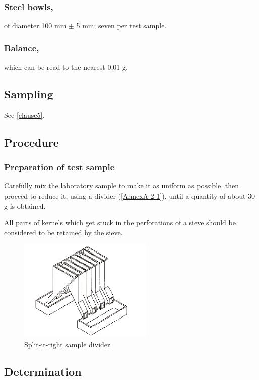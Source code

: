 \label{AnnexA-2-6}
\subsubsection{Steel bowls,}

of diameter 100 mm $\pm$ 5 mm; seven per test sample.

\subsubsection{Balance,}

which can be read to the nearest 0,01 g.

\subsection{Sampling}

See \ref{clause5}.

\subsection{Procedure}

\label{AnnexA-4-1}
\subsubsection{Preparation of test sample}

Carefully mix the laboratory sample to make it as uniform as possible, then proceed to reduce it, using a divider (\ref{AnnexA-2-1}), until a quantity of about 30 g is obtained.

All parts of kernels which get stuck in the perforations of a sieve should be considered to be retained by the sieve.

\begin{figure}
  \label{figureA-1}
  \caption{Split-it-right sample divider}
  \includegraphics{images/a1.png}
\end{figure}

\subsection{Determination}

